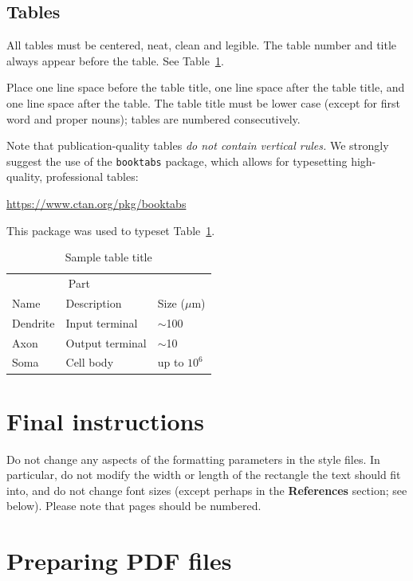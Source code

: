 \documentclass[11pt,a4paper]{article}
\begin{document}
\subsection{Tables}

All tables must be centered, neat, clean and legible.  The table number and
title always appear before the table.  See Table~\ref{sample-table}.

Place one line space before the table title, one line space after the
table title, and one line space after the table. The table title must
be lower case (except for first word and proper nouns); tables are
numbered consecutively.

Note that publication-quality tables \emph{do not contain vertical rules.} We
strongly suggest the use of the \verb+booktabs+ package, which allows for
typesetting high-quality, professional tables:
\begin{center}
  \url{https://www.ctan.org/pkg/booktabs}
\end{center}
This package was used to typeset Table~\ref{sample-table}.

\begin{table}
  \caption{Sample table title}
  \label{sample-table}
  \centering
  \begin{tabular}{lll}
    \toprule
    \multicolumn{2}{c}{Part}                   \\
    \cmidrule(r){1-2}
    Name     & Description     & Size ($\mu$m) \\
    \midrule
    Dendrite & Input terminal  & $\sim$100     \\
    Axon     & Output terminal & $\sim$10      \\
    Soma     & Cell body       & up to $10^6$  \\
    \bottomrule
  \end{tabular}
\end{table}

\section{Final instructions}

Do not change any aspects of the formatting parameters in the style files.  In
particular, do not modify the width or length of the rectangle the text should
fit into, and do not change font sizes (except perhaps in the
\textbf{References} section; see below). Please note that pages should be
numbered.

\section{Preparing PDF files}
\end{document}
